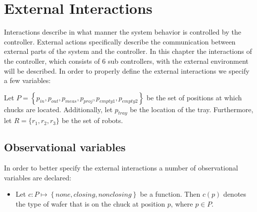 \section{External Interactions}
Interactions describe in what manner the system behavior is controlled by the controller.
External actions specifically describe the communication between external parts of the system and the controller.
In this chapter the interactions of the controller, which consists of $6$ sub controllers, with the external environment will be described.
In order to properly define the external interactions we specify a few variables:

Let $P = \left\{p_\mathit{in}, p_\mathit{out}, p_\mathit{meas}, p_\mathit{proj}, p_\mathit{empty1}, p_\mathit{empty2}\right\}$ be the set of positions at which chucks are located.
Additionally, let $\mathit{p_\mathit{tray}}$ be the location of the tray.
Furthermore, let $R = \{r_1,r_2,r_3\}$ be the set of robots.

\subsection{Observational variables}
In order to better specify the external interactions a number of observational variables are declared:
\begin{itemize}
    \item Let $c : P \mapsto \left\{\mathit{none}, \mathit{closing}, \mathit{nonclosing}\right\}$ be a function.
        Then $c(p)$ denotes the type of wafer that is on the chuck at position $p$, where $p \in P$.
\end{itemize}

